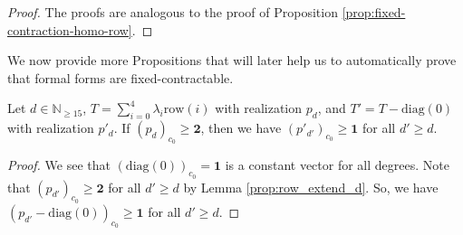 \begin{proof}
    The proofs are analogous to the proof of Proposition \ref{prop:fixed-contraction-homo-row}.
\end{proof}


We now provide more Propositions that will later help us to automatically prove that formal forms are fixed-contractable.

\begin{proposition}\label{prop:row_homo_diag}
    Let \( d \in \mathbb{N}_{\geq 15} \), \( T = \sum_{i=0}^4 \lambda_i \mathrm{row}(i)\) with realization \( p_d \), and \( T' = T - \mathrm{diag}(0) \) with realization \( p'_d \). If \( (p_d)_{c_0} \geq \mathbf{2} \), then we have \( (p'_{d'})_{c_0} \geq \mathbf 1 \) for all \( d' \geq d \).
\end{proposition}

\begin{proof}
     We see that \( (\mathrm{diag}(0))_{c_0} = \mathbf 1 \) is a constant vector for all degrees. Note that \( (p_{d'})_{c_0} \geq \mathbf 2 \) for all \( d' \geq d \) by Lemma \ref{prop:row_extend_d}. So, we have \( (p_{d'} - \mathrm{diag}(0))_{c_0} \geq \mathbf 1 \) for all \( d' \geq d \).
\end{proof}


